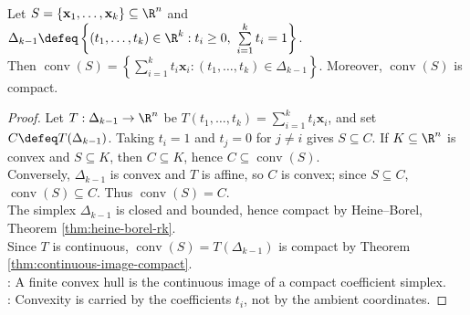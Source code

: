 \begin{proposition} \label{prop:convex-hull-finite-set-combinations-compact} \\
Let $S=\{\mathbf{x}_1,\ldots,\mathbf{x}_k\}\subseteq\R^n$ and $\Delta_{k-1}\defeq\left\{(t_1,\ldots,t_k)\in\R^k:t_i\geq0,\ \sum\limits_{i=1}^k t_i=1\right\}$.\\
Then $\operatorname{conv}(S) = \left\{\sum\limits_{i=1}^k t_i\mathbf{x}_i:(t_1,\ldots,t_k)\in\Delta_{k-1}\right\}$. Moreover, $\operatorname{conv}(S)$ is compact.
\begin{proof}
Let $T:\Delta_{k-1}\to\R^n$ be $T(t_1,\ldots,t_k)=\sum\limits_{i=1}^k t_i\mathbf{x}_i$, and set $C\defeq T(\Delta_{k-1})$. Taking $t_i=1$ and $t_j=0$ for $j\neq i$ gives $S\subseteq C$. If $K\subseteq\R^n$ is convex and $S\subseteq K$, then $C\subseteq K$, hence $C\subseteq\operatorname{conv}(S)$.\\
Conversely, $\Delta_{k-1}$ is convex and $T$ is affine, so $C$ is convex; since $S\subseteq C$, $\operatorname{conv}(S)\subseteq C$. Thus $\operatorname{conv}(S)=C$.\\
The simplex $\Delta_{k-1}$ is closed and bounded, hence compact by Heine--Borel, Theorem \ref{thm:heine-borel-rk}.\\
Since $T$ is continuous, $\operatorname{conv}(S)=T(\Delta_{k-1})$ is compact by Theorem \ref{thm:continuous-image-compact}.\\
: A finite convex hull is the continuous image of a compact coefficient simplex.\\
: Convexity is carried by the coefficients $t_i$, not by the ambient coordinates.
\end{proof}
\end{proposition}

